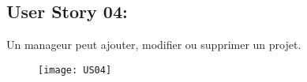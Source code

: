 \newpage
\subsection{User Story 04:}
Un manageur peut ajouter, modifier ou supprimer un projet.

\begin{figure}[!h]
  \begin{center}
        \texttt{[image: US04]}
        \label{US04-dia}
  \end{center}
\end{figure}